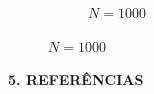 \documentclass[final]{beamer}
\begin{document}
\begin{frame}[t]
\begin{columns}[t,totalwidth=0.6\paperwidth]
\begin{column}{0.45\textwidth}
\begin{figure}[H]
\begin{subfigure}[b]{0.32\textwidth}
        \caption{\(N = 1000\)}
    \end{subfigure}
\end{figure}


    





    \vspace{1.3cm}
{\large\bfseries 5. REFERÊNCIAS}\par

    \vspace{1.3cm}

    
  
    \normalsize
  \end{column}
\end{columns}

\end{frame}
\end{document}
